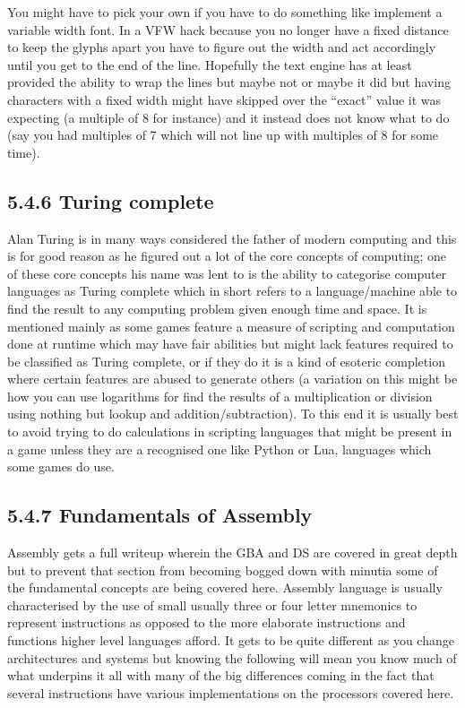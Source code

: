 \documentclass[
]{book}
\begin{document}
You might have to pick your own if you have to do something like implement a variable width font. In a VFW hack because you no longer have a fixed distance to keep the glyphs apart you have to figure out the width and act accordingly until you get to the end of the line. Hopefully the text engine has at least provided the ability to wrap the lines but maybe not or maybe it did but having characters with a fixed width might have skipped over the ``exact'' value it was expecting (a multiple of 8 for instance) and it instead does not know what to do (say you had multiples of 7 which will not line up with multiples of 8 for some time).

\hypertarget{turing-complete}{%
\subsection{5.4.6 Turing complete}\label{turing-complete}}

Alan Turing is in many ways considered the father of modern computing and this is for good reason as he figured out a lot of the core concepts of computing; one of these core concepts his name was lent to is the ability to categorise computer languages as Turing complete which in short refers to a language/machine able to find the result to any computing problem given enough time and space. It is mentioned mainly as some games feature a measure of scripting and computation done at runtime which may have fair abilities but might lack features required to be classified as Turing complete, or if they do it is a kind of esoteric completion where certain features are abused to generate others (a variation on this might be how you can use logarithms for find the results of a multiplication or division using nothing but lookup and addition/subtraction). To this end it is usually best to avoid trying to do calculations in scripting languages that might be present in a game unless they are a recognised one like Python or Lua, languages which some games do use.

\hypertarget{fundamentals-of-assembly}{%
\subsection{5.4.7 Fundamentals of Assembly}\label{fundamentals-of-assembly}}

Assembly gets a full writeup wherein the GBA and DS are covered in great depth but to prevent that section from becoming bogged down with minutia some of the fundamental concepts are being covered here. Assembly language is usually characterised by the use of small usually three or four letter mnemonics to represent instructions as opposed to the more elaborate instructions and functions higher level languages afford. It gets to be quite different as you change architectures and systems but knowing the following will mean you know much of what underpins it all with many of the big differences coming in the fact that several instructions have various implementations on the processors covered here.
\end{document}
